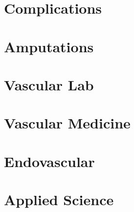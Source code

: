 \documentclass[
]{book}
\begin{document}
\hypertarget{section-7}{%
\section{}\label{section-7}}

\hypertarget{complications}{%
\chapter{Complications}\label{complications}}

\hypertarget{section-8}{%
\section{}\label{section-8}}

\hypertarget{amputations}{%
\chapter{Amputations}\label{amputations}}

\hypertarget{section-9}{%
\section{}\label{section-9}}

\hypertarget{vascular-lab}{%
\chapter{Vascular Lab}\label{vascular-lab}}

\hypertarget{section-10}{%
\section{}\label{section-10}}

\hypertarget{vascular-medicine}{%
\chapter{Vascular Medicine}\label{vascular-medicine}}

\hypertarget{section-11}{%
\section{}\label{section-11}}

\hypertarget{endovascular}{%
\chapter{Endovascular}\label{endovascular}}

\hypertarget{section-12}{%
\section{}\label{section-12}}

\hypertarget{applied-science}{%
\chapter{Applied Science}\label{applied-science}}

\hypertarget{section-13}{%
\section{}\label{section-13}}

  
\end{document}
